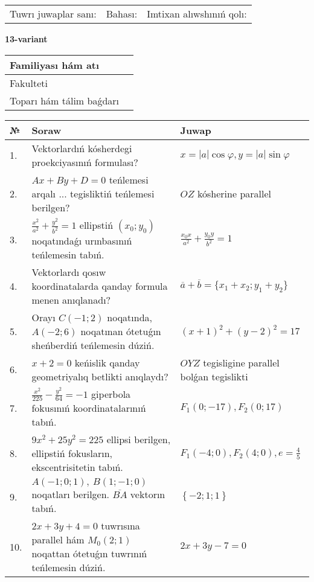 \documentclass{article}
\begin{document}
\vspace{1cm}

\begin{tabular}{lll}
Tuwrı juwaplar sanı: \underline{\hspace{1.5cm}} & 
Bahası: \underline{\hspace{1.5cm}} & 
Imtixan alıwshınıń qolı: \underline{\hspace{2cm}} \\
\end{tabular}

\egroup

\newpage


\textbf{13-variant}\\

\bgroup
\def\arraystretch{1.6} %

\begin{tabular}{|m{5.7cm}|m{9.5cm}|}
\hline
Familiyası hám atı & \\
\hline
Fakulteti  & \\
\hline
Toparı hám tálim baǵdarı  & \\
\hline
\end{tabular}

\vspace{1cm}

\begin{tabular}{|m{0.7cm}|m{10cm}|m{4cm}|}
\hline
№ & Soraw & Juwap \\
\hline
1. & Vektorlardıń kósherdegi proekciyasınıń formulası? & $x=|a|\cos\varphi, y=|a|\sin\varphi$ \\
\hline
2. & $Ax+By+D=0$ teńlemesi arqalı ... tegisliktiń teńlemesi berilgen? & $OZ$ kósherine parallel \\
\hline
3. & $\frac{x^2}{a^2}+\frac{y^2}{b^2}=1$ ellipstiń $(x_0;y_0)$ noqatındaǵı urınbasınıń teńlemesin tabıń. & $\frac{x_0x}{a^2}+\frac{y_0y}{b^2}=1$ \\
\hline
4. & Vektorlardı qosıw koordinatalarda qanday formula menen anıqlanadı? & $\overline{a}+\overline{b}=\{x_1+x_2;y_1+y_2\}$ \\
\hline
5. & Orayı $C (-1;2)$ noqatında, $A (-2;6 )$ noqatınan ótetuǵın sheńberdiń teńlemesin dúziń. & $(x+1)^{2}+(y-2)^{2}=17$ \\
\hline
6. & $x+2=0$ keńislik qanday geometriyalıq betlikti anıqlaydı? &  $OYZ$ tegisligine parallel bolǵan tegislikti \\
\hline
7. & $\frac{x^{2}}{225}-\frac{y^{2}}{64}=-1$ giperbola fokusınıń koordinatalarınıń tabıń. & $F_{1}(0;-17), F_{2}(0;17)$ \\
\hline
8. & $9x^{2}+25y^{2}=225$ ellipsi berilgen, ellipstiń fokusların, ekscentrisitetin tabıń. & $F_1\left(-4;0 \right) , F_2\left( 4;0 \right) , e = \frac{4}{5}$ \\
\hline
9. & $A (-1;0;1),\ B (1;-1;0)$ noqatları berilgen. $\overline{BA}$ vektorın tabıń. & $\left\{ - 2;1;1 \right\}$ \\
\hline
10. & $2x+3y+4=0$ tuwrısına parallel hám $M_{0} (2;1)$ noqattan ótetuǵın tuwrınıń teńlemesin dúziń. & $2x+3y-7=0$ \\
\hline
\end{tabular}
\end{document}
